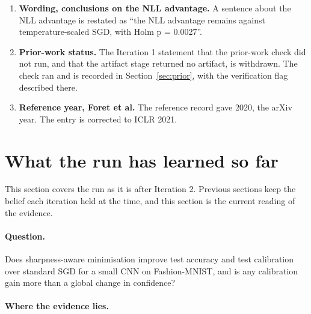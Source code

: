 \documentclass[11pt,letterpaper]{article}
\begin{document}
\begin{enumerate}
\item \textbf{Wording, conclusions on the NLL advantage.} A sentence about the NLL advantage is restated as ``the NLL advantage remains against temperature-scaled SGD, with Holm p = 0.0027''.
\item \textbf{Prior-work status.} The Iteration 1 statement that the prior-work check did not run, and that the artifact stage returned no artifact, is withdrawn. The check ran and is recorded in Section~\ref{sec:prior}, with the verification flag described there.
\item \textbf{Reference year, Foret et al.} The reference record gave 2020, the arXiv year. The entry is corrected to ICLR 2021.
\end{enumerate}

\section{What the run has learned so far}

This section covers the run as it is after Iteration 2. Previous sections keep the belief each iteration held at the time, and this section is the current reading of the evidence.

\paragraph{Question.} Does sharpness-aware minimisation improve test accuracy and test calibration over standard SGD for a small CNN on Fashion-MNIST, and is any calibration gain more than a global change in confidence?

\paragraph{Where the evidence lies.}
\end{document}
